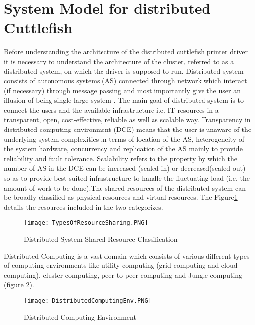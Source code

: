 \section{System Model for distributed Cuttlefish}

Before understanding the architecture of the distributed cuttlefish printer driver it is necessary to understand the architecture of the cluster, referred to as a distributed system, on which the driver is supposed to run. Distributed system consists of autonomous systems (AS) connected through network which interact (if necessary) through message passing and most importantly give the user an illusion of being single large system \cite{DCE}. The main goal of distributed system is to connect the users and the available infrastructure i.e. IT resources in a transparent, open, cost-effective, reliable as well as scalable way. Transparency in distributed computing environment (DCE) means that the user is unaware of the underlying system complexities in terms of location of the AS, heterogeneity of the system hardware, concurrency and replication of the AS mainly to provide reliability and fault tolerance. Scalability refers to the property by which the number of AS in the DCE can be increased (scaled in) or decreased(scaled out) so as to provide best suited infrastructure to handle the fluctuating load (i.e. the amount of work to be done).The shared resources of the distributed system can be broadly classified as physical resources and virtual resources. The Figure\ref{fig:TypesOfResourceSharing} details the resources included in the two categorizes. 

\begin{figure}[ht!]
\centering
\texttt{[image: TypesOfResourceSharing.PNG]}
\caption{Distributed System Shared Resource Classification}
\label{fig:TypesOfResourceSharing}
\end{figure}
  
Distributed Computing is a vast domain which consists of various different types of computing environments like utility computing (grid computing and cloud computing), cluster computing, peer-to-peer computing and Jungle computing (figure \ref{fig:DistributedComputingEnv}). 

\begin{figure}[ht!]
\centering
\texttt{[image: DistributedComputingEnv.PNG]}
\caption{Distributed Computing Environment}
\label{fig:DistributedComputingEnv}
\end{figure}

